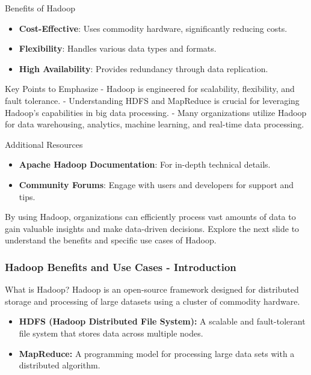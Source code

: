 \documentclass[aspectratio=169]{beamer}
\begin{document}
\begin{frame}[fragile]{Benefits of Hadoop}
    \begin{itemize}
        \item \textbf{Cost-Effective}: Uses commodity hardware, significantly reducing costs.
        \item \textbf{Flexibility}: Handles various data types and formats.
        \item \textbf{High Availability}: Provides redundancy through data replication.
    \end{itemize}
    
    \begin{block}{Key Points to Emphasize}
        - Hadoop is engineered for scalability, flexibility, and fault tolerance.
        - Understanding HDFS and MapReduce is crucial for leveraging Hadoop's capabilities in big data processing.
        - Many organizations utilize Hadoop for data warehousing, analytics, machine learning, and real-time data processing.
    \end{block}
\end{frame}

\begin{frame}[fragile]{Additional Resources}
    \begin{itemize}
        \item \textbf{Apache Hadoop Documentation}: For in-depth technical details.
        \item \textbf{Community Forums}: Engage with users and developers for support and tips.
    \end{itemize}
    
    By using Hadoop, organizations can efficiently process vast amounts of data to gain valuable insights and make data-driven decisions. Explore the next slide to understand the benefits and specific use cases of Hadoop.
\end{frame}

\begin{frame}[fragile]
    \frametitle{Hadoop Benefits and Use Cases - Introduction}
    \begin{block}{What is Hadoop?}
        Hadoop is an open-source framework designed for distributed storage and processing of large datasets using a cluster of commodity hardware.
    \end{block}
    \begin{itemize}
        \item \textbf{HDFS (Hadoop Distributed File System):} A scalable and fault-tolerant file system that stores data across multiple nodes.
        \item \textbf{MapReduce:} A programming model for processing large data sets with a distributed algorithm.
    \end{itemize}
\end{frame}
\end{document}
